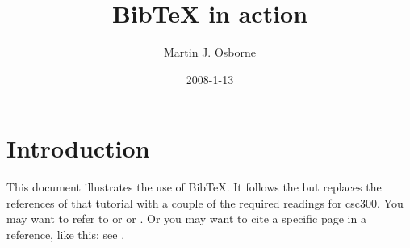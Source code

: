 \documentclass[12pt]{article}
\begin{document}
\title{BibTeX in action}
\author{Martin J. Osborne}
\date{2008-1-13}

\maketitle

\section{Introduction}
This document illustrates the use of BibTeX\@.  It follows the
\cite{bibtex-tutorial}  but replaces the references of that tutorial
with a couple of the required readings for csc300. You may want to refer to
\cite{warren-brandeis-1890} or \cite{siva05} or \cite{gosling-interview}.  Or you may want to cite a
specific page in a reference, like this: see \citet[p.~199]{java-jvm-spec}.





\end{document}
